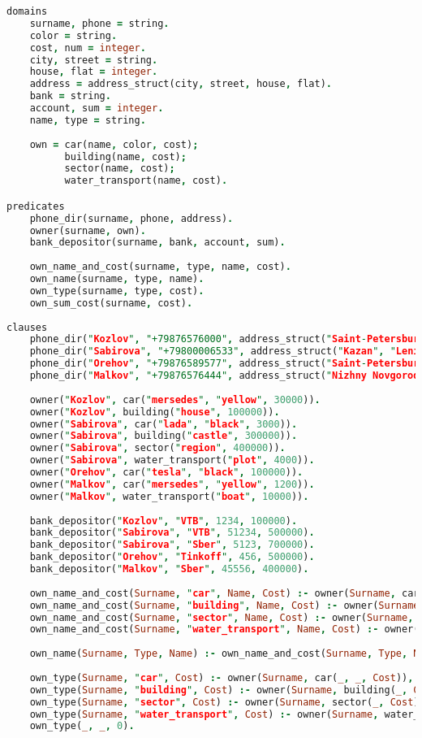 \documentclass[12pt]{report}
\begin{document}
\begin{lstlisting}[language=Prolog]
domains
	surname, phone = string.
	color = string.
	cost, num = integer.
	city, street = string.
	house, flat = integer.
	address = address_struct(city, street, house, flat).
	bank = string.
	account, sum = integer.
	name, type = string.
	
	own = car(name, color, cost);
	      building(name, cost);
	      sector(name, cost);
	      water_transport(name, cost). 

predicates
	phone_dir(surname, phone, address).
	owner(surname, own).
	bank_depositor(surname, bank, account, sum).
	
	own_name_and_cost(surname, type, name, cost).
	own_name(surname, type, name).
	own_type(surname, type, cost).
	own_sum_cost(surname, cost).
	
clauses
	phone_dir("Kozlov", "+79876576000", address_struct("Saint-Petersburg", "Mira", 4, 12)).
	phone_dir("Sabirova", "+79800006533", address_struct("Kazan", "Leninskaya", 31, 33)).
	phone_dir("Orehov", "+79876589577", address_struct("Saint-Petersburg", "Annikova", 23, 4)).
	phone_dir("Malkov", "+79876576444", address_struct("Nizhny Novgorod", "Annikova", 48, 1)).
	
	owner("Kozlov", car("mersedes", "yellow", 30000)).
	owner("Kozlov", building("house", 100000)).
	owner("Sabirova", car("lada", "black", 3000)).
	owner("Sabirova", building("castle", 300000)).
	owner("Sabirova", sector("region", 400000)).
 	owner("Sabirova", water_transport("plot", 4000)).
	owner("Orehov", car("tesla", "black", 100000)).
	owner("Malkov", car("mersedes", "yellow", 1200)).
	owner("Malkov", water_transport("boat", 10000)).
	
	bank_depositor("Kozlov", "VTB", 1234, 100000).
	bank_depositor("Sabirova", "VTB", 51234, 500000).
	bank_depositor("Sabirova", "Sber", 5123, 700000).
	bank_depositor("Orehov", "Tinkoff", 456, 500000).
	bank_depositor("Malkov", "Sber", 45556, 400000).
	
	own_name_and_cost(Surname, "car", Name, Cost) :- owner(Surname, car(Name, _, Cost)).
	own_name_and_cost(Surname, "building", Name, Cost) :- owner(Surname, building(Name, Cost)).
	own_name_and_cost(Surname, "sector", Name, Cost) :- owner(Surname, sector(Name, Cost)).
	own_name_and_cost(Surname, "water_transport", Name, Cost) :- owner(Surname, water_transport(Name, Cost)).
	
	own_name(Surname, Type, Name) :- own_name_and_cost(Surname, Type, Name, _).
	
	own_type(Surname, "car", Cost) :- owner(Surname, car(_, _, Cost)), !.
	own_type(Surname, "building", Cost) :- owner(Surname, building(_, Cost)), !.
	own_type(Surname, "sector", Cost) :- owner(Surname, sector(_, Cost)), !.
	own_type(Surname, "water_transport", Cost) :- owner(Surname, water_transport(_, Cost)), !.
	own_type(_, _, 0).
	

\end{lstlisting}
\end{document}
